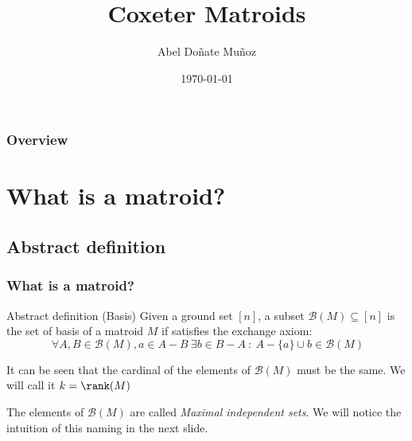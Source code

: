 \documentclass{beamer}
\title{Coxeter Matroids} %
\author{Abel Doñate Muñoz} %
\institute[UPC] %
{
Universitat Politècnica de Catalunya \\ %
\medskip
\textit{abel.donate.munoz@gmail.com} %
}
\date{\today} %
\begin{document}
\begin{frame}
\titlepage %
\end{frame}

\begin{frame}
\frametitle{Overview} %
\tableofcontents %
\end{frame}


\section{What is a matroid?} %

\subsection{Abstract definition}

\begin{frame}
\frametitle{What is a matroid?}
\begin{block}{Abstract definition (Basis)}
  Given a ground set $[n]$, a subset $\mathcal{B}(M)\subseteq [n]$ is the set of basis of a matroid $M$ if satisfies the exchange axiom:
   \[
  \ \forall A, B \in \mathcal{B}(M), a \in A-B \ \exists b\in B-A \ : \ A-\{a\}\cup {b} \in \mathcal{B}(M)
  \] 
\end{block}
It can be seen that the cardinal of the elements of $\mathcal{B}(M)$ must be the same. We will call it $k = \rank(M)$

The elements of  $\mathcal{B}(M)$ are called \textit{Maximal independent sets}. We will notice the intuition of this naming in the next slide.
\end{frame}
\end{document}
